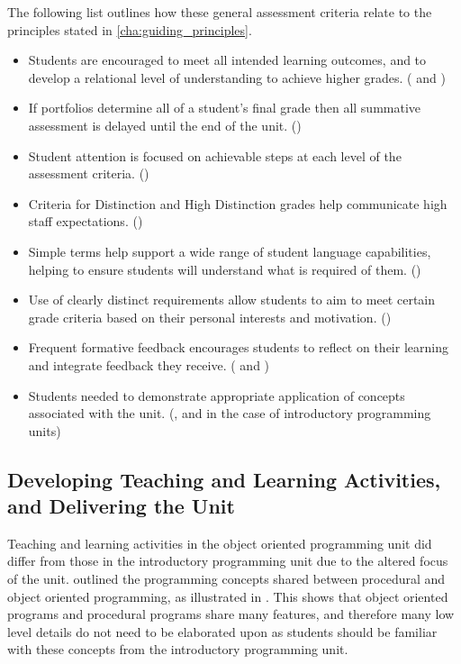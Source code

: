 The following list outlines how these general assessment criteria relate to the principles stated in \cref{cha:guiding_principles}.

\begin{itemize}[noitemsep,nolistsep]
	\item Students are encouraged to meet all intended learning outcomes, and to develop a relational level of understanding to achieve higher grades. ( and )
	\item If portfolios determine all of a student's final grade then all summative assessment is delayed until the end of the unit. ()
	\item Student attention is focused on achievable steps at each level of the assessment criteria. ()
	\item Criteria for Distinction and High Distinction grades help communicate high staff expectations. ()
	\item Simple terms help support a wide range of student language capabilities, helping to ensure students will understand what is required of them. ()
	\item Use of clearly distinct requirements allow students to aim to meet certain grade criteria based on their personal interests and motivation. ()
	\item Frequent formative feedback encourages students to reflect on their learning and integrate feedback they receive. ( and )
	\item Students needed to demonstrate appropriate application of concepts associated with the unit. (,  and  in the case of introductory programming units)
\end{itemize}


\subsection{Developing Teaching and Learning Activities, and Delivering the Unit} %
\label{sub:oop_developing_teaching_and_learning_activities}

Teaching and learning activities in the object oriented programming unit did differ from those in the introductory programming unit due to the altered focus of the unit.  outlined the programming concepts shared between procedural and object oriented programming, as illustrated in . This shows that object oriented programs and procedural programs share many features, and therefore many low level details do not need to be elaborated upon as students should be familiar with these concepts from the introductory programming unit. 

